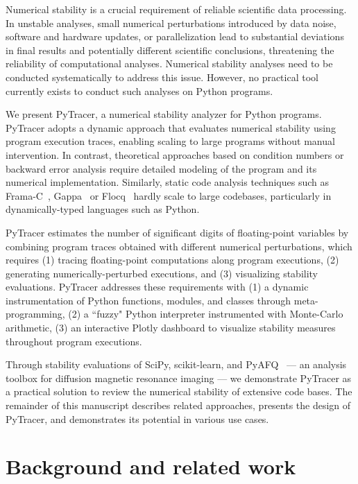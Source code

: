\documentclass[11pt]{article}
\begin{document}
Numerical stability is a crucial requirement of reliable scientific data
processing. In unstable analyses, small numerical perturbations introduced by data noise, software and hardware updates, or parallelization lead to substantial deviations in final results and potentially different scientific conclusions, threatening the reliability of computational analyses. Numerical stability analyses need to be conducted systematically to address this issue. However, no practical tool currently exists to conduct such analyses on Python programs.

We present PyTracer, a numerical stability analyzer for Python programs.
PyTracer adopts a dynamic approach that evaluates numerical stability using program execution traces, enabling scaling to large programs without manual intervention. In contrast, theoretical approaches based on condition numbers or backward error analysis require detailed modeling of the program and its numerical implementation. Similarly, static code analysis techniques such as Frama-C~\cite{cuoq2012frama}, Gappa~\cite{de2010certifying} or Flocq~\cite{boldo2011flocq} hardly scale to large codebases, particularly in dynamically-typed languages such as Python.

PyTracer estimates the number of significant digits of floating-point variables by combining program traces obtained with different numerical perturbations, which requires (1) tracing floating-point computations along program executions, (2) generating numerically-perturbed executions, and (3) visualizing stability evaluations. PyTracer addresses these requirements with (1) a dynamic instrumentation of Python functions, modules, and classes through meta-programming, (2) a ``fuzzy" Python interpreter instrumented with Monte-Carlo arithmetic, (3) an interactive Plotly dashboard to visualize stability measures throughout program executions.

Through stability evaluations of 
SciPy, scikit-learn, and PyAFQ~\cite{kruper2021evaluating} --- an analysis toolbox for diffusion magnetic resonance imaging --- we demonstrate PyTracer as a practical solution to review the numerical stability of extensive code bases. The remainder of this manuscript describes related approaches, presents the design of PyTracer, and demonstrates its potential in various use cases.


\section{Background and related work}
\end{document}
